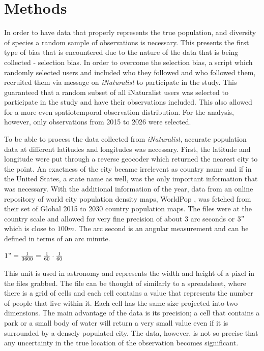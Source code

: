 \documentclass{article}
\begin{document}
\section{Methods}

In order to have data that properly represents the true population, and diversity of species a random sample of observations is necessary. This presents the first type of bias that is encountered due to the nature of the data that is being collected - selection bias. In order to overcome the selection bias, a script which randomly selected users and included who they followed and who followed them, recruited them via message on \textit{iNaturalist} to participate in the study. This guaranteed that a random subset of all iNaturalist users was selected to participate in the study and have their observations included. This also allowed for a more even spatiotemporal observation distribution. For the analysis, however, only observations from 2015 to 2026 were selected.

To be able to process the data collected from \textit{iNaturalist}, accurate population data at different latitudes and longitudes was necessary. First, the latitude and longitude were put through a reverse geocoder which returned the nearest city to the point. An exactness of the city became irrelevent as country name and if in the United States, a state name as well, was the only important information that was necessary. With the additional information of the year, data from an online repository of world city population density maps, WorldPop \cite{worldpop}, was fetched from their set of Global 2015 to 2030 country population maps. The files were at the country scale and allowed for very fine precision of about 3 arc seconds or $3"$ which is close to $100m$. The arc second is an angular measurement and can be defined in terms of an arc minute.

\begin{center}
$ 1" = \frac{1}{3600} = \frac{1}{60} \cdot \frac{1}{60} $
\end{center}

This unit is used in astronomy and represents the width and height of a pixel in the files grabbed. The file can be thought of similarly to a spreadsheet, where there is a grid of cells and each cell contains a value that represents the number of people that live within it. Each cell has the same size projected into two dimensions. The main advantage of the data is its precision; a cell that contains a park or a small body of water will return a very small value even if it is surrounded by a densely populated city. The data, however, is not so precise that any uncertainty in the true location of the observation becomes significant.
\end{document}
